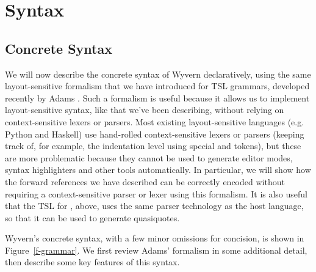 \section{Syntax}
\label{s:approach}

\subsection{Concrete Syntax}

We will now describe the concrete syntax of Wyvern declaratively, using the same layout-sensitive formalism that we have introduced for TSL grammars, developed recently by Adams \cite{Adams:2013:PPI:2429069.2429129}. Such a formalism is useful because it allows us to implement  layout-sensitive syntax, like that we've been describing, without relying on context-sensitive lexers or parsers. Most existing layout-sensitive languages (e.g. Python and Haskell) use hand-rolled context-sensitive lexers or parsers (keeping track of, for example, the indentation level using special  and  tokens), but these are more problematic because they cannot be used to generate editor modes, syntax highlighters and other tools automatically. In particular, we will show how the forward references we have described can be correctly encoded without requiring a context-sensitive parser or lexer using this formalism. It is also useful that the TSL for , above, uses the same parser technology as the host language, so that it can be used to generate quasiquotes.

Wyvern's concrete syntax, with a few minor omissions for concision, is shown in Figure~\ref{f-grammar}. We first review Adams' formalism in some additional detail, then describe some key features of this syntax.

